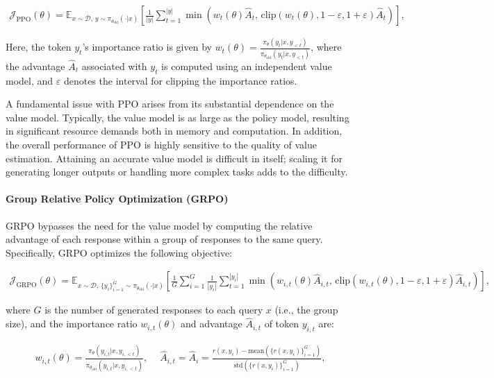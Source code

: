 \begin{align}
\mathcal{J}_\text{PPO}(\theta) = \mathbb{E}_{ x \sim \mathcal{D},\, y \sim \pi_{\theta_\text{old}}( \cdot | x) }
\left[ \frac{1}{|y|} \sum_{t=1}^{|y|} 
\min \left( w_{t}(\theta) \widehat{A}_{t},  \, \mathrm{clip} \left( w_{t}(\theta), 1 - {\varepsilon}, 1 + {\varepsilon}\right) \widehat{A}_{t} \right)
\right],
\end{align}

Here, the token $y_t$'s importance ratio is given by $w_{t}(\theta) = \frac{ \pi_{\theta} (y_{t} | x, y_{<t}) }{ \pi_{\theta_\text{old}} (y_{t} | x,y_{<t})} $, where the advantage $\widehat{A}_{t}$ associated with $y_t$ is computed using an independent value model, and $\varepsilon$ denotes the interval for clipping the importance ratios.

A fundamental issue with PPO arises from its substantial dependence on the value model. Typically, the value model is as large as the policy model, resulting in significant resource demands both in memory and computation. In addition, the overall performance of PPO is highly sensitive to the quality of value estimation. Attaining an accurate value model is difficult in itself; scaling it for generating longer outputs or handling more complex tasks adds to the difficulty.

\paragraph{Group Relative Policy Optimization (GRPO)} GRPO \citep{grpo} bypasses the need for the value model by computing the relative advantage of each response within a group of responses to the same query. Specifically, GRPO optimizes the following objective:

\begin{align}
\label{equ:grpo}
\mathcal{J}_\text{GRPO}(\theta) = \mathbb{E}_{ x \sim \mathcal{D},\, \{y_i\}_{i=1}^G \sim \pi_{\theta_\text{old}}( \cdot | x) }
\left[ \frac{1}{G} \sum_{i=1}^{G} \frac{1}{|y_i|} \sum_{t=1}^{|y_i|} 
\min \left( w_{i,t}(\theta) \widehat{A}_{i,t},  \, \mathrm{clip} \left( w_{i,t}(\theta), 1 - {\varepsilon}, 1 + {\varepsilon}\right) \widehat{A}_{i,t} \right)
\right],
\end{align}

where $G$ is the number of generated responses to each query $x$ (i.e., the group size), and the importance ratio $w_{i,t}(\theta)$ and advantage $\widehat{A}_{i,t}$ of token $y_{i,t}$ are:

\begin{align}
    w_{i,t}(\theta)=\frac{ \pi_{\theta} (y_{i,t} | x, y_{i,<t}) }{ \pi_{\theta_\text{old}} (y_{i,t} | x,y_{i,<t})},\quad\ 
    \widehat{A}_{i,t} = \widehat{A}_{i} = \frac{r(x, y_i) - \mathrm{mean} \left( \{ r(x, y_i) \}_{i=1}^G \right) }{ \mathrm{std} \left( \{ r(x, y_i) \}_{i=1}^G \right) },
\end{align}

